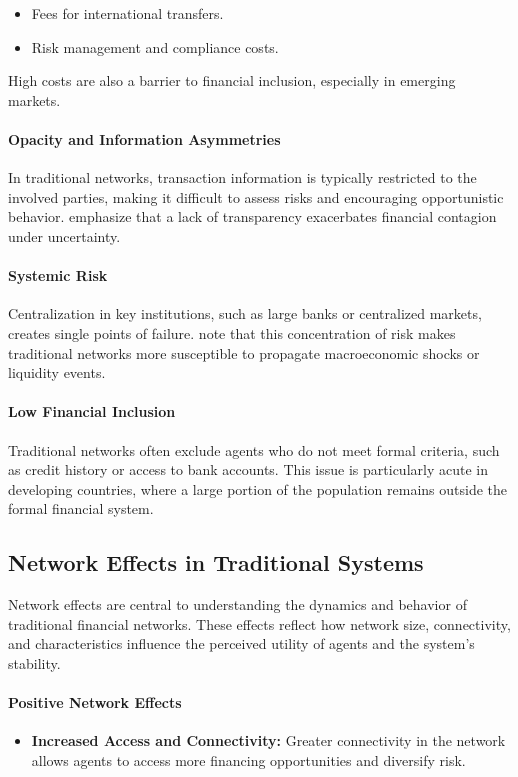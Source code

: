 \begin{itemize}
    \item Fees for international transfers.
    \item Risk management and compliance costs.
\end{itemize}

High costs are also a barrier to financial inclusion, especially in emerging markets.

\paragraph{Opacity and Information Asymmetries}
In traditional networks, transaction information is typically restricted to the involved parties, making it difficult to assess risks and encouraging opportunistic behavior.  emphasize that a lack of transparency exacerbates financial contagion under uncertainty.

\paragraph{Systemic Risk}
Centralization in key institutions, such as large banks or centralized markets, creates single points of failure.  note that this concentration of risk makes traditional networks more susceptible to propagate macroeconomic shocks or liquidity events.

\paragraph{Low Financial Inclusion}
Traditional networks often exclude agents who do not meet formal criteria, such as credit history or access to bank accounts. This issue is particularly acute in developing countries, where a large portion of the population remains outside the formal financial system. \cite{singer_financial_2017}

\subsection{Network Effects in Traditional Systems}

Network effects are central to understanding the dynamics and behavior of traditional financial networks. These effects reflect how network size, connectivity, and characteristics influence the perceived utility of agents and the system's stability.

\paragraph{Positive Network Effects}
\begin{itemize}
\item \textbf{Increased Access and Connectivity:} Greater connectivity in the network allows agents to access more financing opportunities and diversify risk.

\end{itemize}

